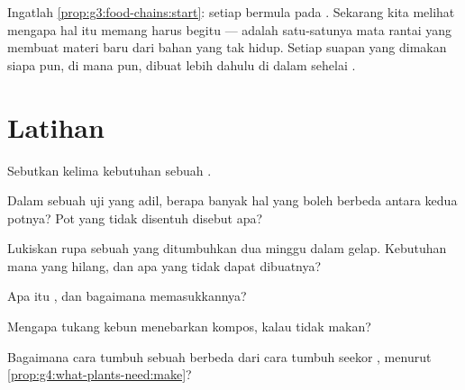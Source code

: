 \begin{remark}\label{rem:g4:what-plants-need:everyone}
Ingatlah \cref{prop:g3:food-chains:start}: setiap 
bermula pada . Sekarang kita melihat mengapa hal itu memang
harus begitu ---  adalah satu-satunya mata rantai yang membuat
materi baru dari bahan yang tak hidup. Setiap suapan yang dimakan
siapa pun, di mana pun, dibuat lebih dahulu di dalam sehelai .
\end{remark}

\section{Latihan}

\begin{exercise}[$\star$]\label{exo:g4:what-plants-need:1}
Sebutkan kelima kebutuhan sebuah .
\end{exercise}

\begin{exercise}[$\star$]\label{exo:g4:what-plants-need:2}
Dalam sebuah uji yang adil, berapa banyak hal yang boleh berbeda
antara kedua potnya? Pot yang tidak disentuh disebut apa?
\end{exercise}

\begin{exercise}[$\star$]\label{exo:g4:what-plants-need:3}
Lukiskan rupa sebuah  yang ditumbuhkan dua minggu dalam gelap.
Kebutuhan mana yang hilang, dan apa yang tidak dapat dibuatnya?
\end{exercise}

\begin{exercise}[$\star$]\label{exo:g4:what-plants-need:4}
Apa itu , dan bagaimana  memasukkannya?
\end{exercise}

\begin{exercise}[$\star$]\label{exo:g4:what-plants-need:5}
Mengapa tukang kebun menebarkan kompos, kalau  tidak makan?
\end{exercise}

\begin{exercise}[$\star$]\label{exo:g4:what-plants-need:6}
Bagaimana cara tumbuh sebuah  berbeda dari cara tumbuh seekor
, menurut \cref{prop:g4:what-plants-need:make}?
\end{exercise}


